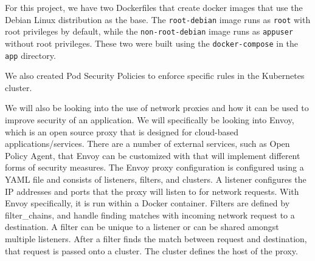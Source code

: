 For this project, we have two Dockerfiles that create docker images that use the Debian Linux distribution
as the base. The \verb|root-debian| image runs as \verb|root| with root privileges by 
default, while the \verb|non-root-debian| image runs as \verb|appuser| without root privileges.
These two were built using the \verb|docker-compose| in the \verb|app| directory.

We also created Pod Security Policies to enforce specific rules in the Kubernetes cluster.

We will also be looking into the use of network proxies and how it can be used to improve security
of an application. We will specifically be looking into Envoy, which is an open source proxy that is designed
for cloud-based applications/services. There are a number of external services, such as Open Policy Agent,
that Envoy can be customized with that will implement different forms of security measures. The Envoy proxy
configuration is configured using a YAML file and consists of listeners, filters, and clusters. A listener
configures the IP addresses and ports that the proxy will listen to for network requests. With Envoy specifically,
it is run within a Docker container. Filters are defined by filter_chains, and handle finding matches with incoming
network request to a destination. A filter can be unique to a listener or can be shared amongst multiple listeners.
After a filter finds the match between request and destination, that request is passed onto a cluster. The cluster
defines the host of the proxy.
